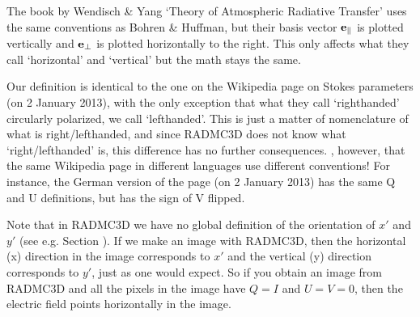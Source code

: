 \documentclass[letterpaper,10pt,english]{sphinxmanual}
\begin{document}
The book by Wendisch \& Yang ‘Theory of Atmospheric Radiative Transfer’ uses the
same conventions as Bohren \& Huffman, but their basis vector \({\bf
e}_{\parallel}\) is plotted vertically and \({\bf e}_{\perp}\) is plotted
horizontally to the right. This only affects what they call ‘horizontal’ and
‘vertical’ but the math stays the same.

Our definition is identical to the one on the  Wikipedia page on Stokes
parameters  (on 2 January 2013),
with the only exception that what they call ‘righthanded’ circularly polarized,
we call ‘lefthanded’. This is just a matter of nomenclature of what is
right/left\sphinxhyphen{}handed, and since RADMC\sphinxhyphen{}3D does not know what ‘right/lefthanded’ is,
this difference has no further consequences. , however, that the same
Wikipedia page in different languages use different conventions! For instance,
the German version of the page (on 2 January 2013) has the same Q and U
definitions, but has the sign of V flipped.

Note that in RADMC\sphinxhyphen{}3D we have no global definition of the orientation of
\(x'\) and \(y'\) (see e.g. Section
{\hyperref[\detokenize{dustradtrans:sec-orientation-vector-stokes}]{}}). If we make an image with RADMC\sphinxhyphen{}3D, then
the horizontal (x\sphinxhyphen{}) direction in the image corresponds to \(x'\) and the
vertical (y\sphinxhyphen{}) direction corresponds to \(y'\), just as one would expect. So
if you obtain an image from RADMC\sphinxhyphen{}3D and all the pixels in the image have
\(Q=I\) and \(U=V=0\), then the electric field points horizontally in
the image.
\end{document}

